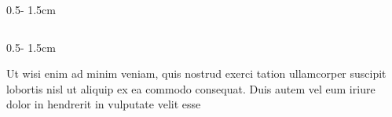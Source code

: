 \documentclass{uibposter}
\begin{document}
\begin{frame}
\begin{columns}
\begin{column}{0.5\textwidth - 1.5cm}
\begin{column}{0.5\textwidth - 1.5cm}
{    Ut wisi enim ad minim veniam, quis nostrud exerci tation ullamcorper suscipit lobortis nisl ut aliquip ex ea commodo consequat. Duis autem vel eum iriure dolor in hendrerit in vulputate velit esse

    }
\end{column}
\end{column}
\end{columns}





\end{frame}
\end{document}
